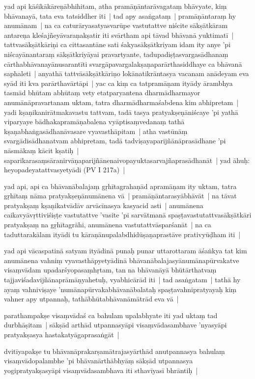 \documentclass[article,12pt,a4paper]{memoir}
\newcommand{\persName}[1]{#1}
\begin{document}
	  \pstart yad api kāśikākāreṇābhihitam, atha pramāṇāntarāvagataṃ bhāvyate, kiṃ bhāvanayā, tata eva tatsiddher iti | tad apy asaṅgataṃ | pramāṇāntaraṃ hy anumānam | na ca caturāryasatyasvarūpe vastutattve niścite sākṣātkāram antareṇa kleśajñeyāvaraṇakṣatir iti svārtham api tāvad bhāvanā yuktimatī | tattvasākṣātkāriṇi ca cittasantāne sati śakyasākṣātkriyam idam ity anye 'pi niścayānantaraṃ sākṣātkriyāyai pravartyante, tadupadiṣṭasvargasādhanaṃ cārthabhāvanayānusarantīti svargāpavargalakṣaṇaparārthasiddhaye ca bhāvanā saphaleti | anyathā tattvāsākṣātkāriṇo lokānatikrāntasya vacanam anādeyam eva syād iti kva parārthavārtāpi | yac ca kiṃ ca tatpramāṇam ityādy ārambhya tasmād bhūtam abhūtaṃ vety etatparyantena dharmādharmayor anumānāpravartanam uktam, tatra dharmādharmaśabdena kim abhipretam | yadi kṣaṇikanirātmakavastu tattvam, tadā tasya pratyakṣeṇāniścaye 'pi yathā viparyaye bādhakapramāṇabalena vyāptisaṃvedanaṃ tathā kṣaṇabhaṅgasādhanāvasare vyavasthāpitam | atha vastūnāṃ svargādisādhanatvam abhipretam, tadā tadviṣayaparijñānāprasādhane 'pi nāsmākaṃ kācit kṣatiḥ | saparikarasaṃsāranirvāṇaparijñānenaivopayuktasarvajñaprasādhanāt | yad āhuḥ: heyopadeyatattvasyetyādi (PV I 217a) | 
	\pend
      

	  \pstart yad api, api ca bhāvanābalajaṃ gṛhītagrahaṇād apramāṇam ity uktam, tatra gṛhītaṃ nāma pratyakṣeṇānumānena vā | pramāṇāntarasyābhāvāt | na tāvat pratyakṣaṃ kṣaṇikatvādāv arvācīnasya kasyacid asti | anumānena caikavyāvṛttiviśiṣṭe vastutattve 'vasite 'pi sarvātmanā spaṣṭavastutattvasākṣātkāri pratyakṣaṃ na gṛhītagrāhi, anumānena vastutattvāsparśanāt | na ca taduttarakālam ityādi tu kāraṇānupalabdhidūṣaṇaprastāve prativyūḍham iti | 
	\pend
      

	  \pstart yad api \persName{vācaspatinā} satyam ityādinā punaḥ punar uttarottaram āśaṅkya tat kim anumānena vahniṃ vyavasthāpyetyādinā bhāvanābalajasyānumānapūrvakatve visaṃvādam upadarśyopasaṃhṛtam, tan na bhāvanāyā bhūtārthatvaṃ tajjaviśadavijñānaprāmāṇyahetuḥ, vyabhicārād iti | tad asaṅgatam | tathā hy ayaṃ vahniviṣaye 'numānapūrvakabhāvanābalataḥ spaṣṭavahnipratyayaḥ kiṃ vahner apy utpannaḥ, tathābhūtabhāvanāmātrād eva vā |
	\pend
      

	  \pstart parathampakṣe visaṃvādaś ca bahulam upalabhyate iti yad uktaṃ tad durbhāṣitam | sākṣād arthād utpannasyāpi visaṃvādasambhave 'nyasyāpi pratyakṣasya hastakatyāgaprasaṅgāt | 
	\pend
      

	  \pstart dvitīyapakṣe tu bhāvanāprakarṣamātrajasyārthād anutpannasya bahulaṃ visaṃvādopalambhe 'pi bhāvanārthābhyāṃ sākṣād utpannasya yogipratyakṣasyāpi visaṃvādasambhava iti sthavīyasī bhrāntiḥ | 
	\pend
      
\end{document}
